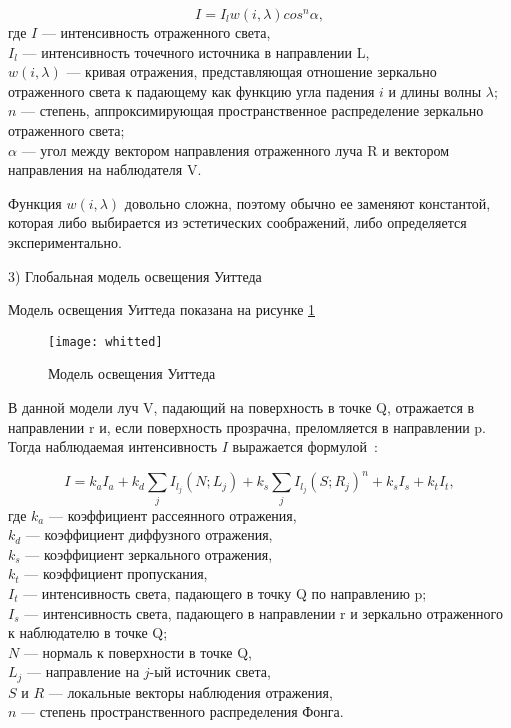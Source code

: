 \begin{equation}\label{phong_ref_eq}
	I = I_l w(i, \lambda) cos^n \alpha,
\end{equation}
где $I$ --- интенсивность отраженного света,\\
\text{~~~~~~}$I_l$ --- интенсивность точечного источника в направлении L,\\
\text{~~~~~~}$w(i, \lambda)$ --- кривая отражения, представляющая отношение зеркально отраженного света к падающему как функцию угла падения $i$ и длины волны $\lambda$;\\
\text{~~~~~~}$n$ --- степень, аппроксимирующая пространственное распределение зеркально отраженного света;\\
\text{~~~~~~}$\alpha$ --- угол между вектором направления отраженного луча R и
вектором направления на наблюдателя V.

Функция $w(i, \lambda)$ довольно
сложна, поэтому обычно ее заменяют константой, которая либо выбирается из
эстетических соображений, либо определяется экспериментально.

3) Глобальная модель освещения Уиттеда

Модель освещения Уиттеда показана на рисунке \ref{whitted}

\begin{figure}[H]
	\centering
	\texttt{[image: whitted]}
	\caption{Модель освещения Уиттеда}
	\label{whitted}
\end{figure}

В данной модели луч V, падающий на поверхность в точке Q, отражается в
направлении r и, если поверхность прозрачна, преломляется в направлении p. Тогда наблюдаемая интенсивность $I$ выражается формулой~\cite{rojers}:

\begin{equation}\label{whitted_eq}
	I = k_a I_a + k_d \sum_{j} I_{l_j} (N; L_j) + k_s \sum_{j} I_{l_j} (S; R_j)^n + k_s I_s + k_t I_t,
\end{equation}
где $k_a$ --- коэффициент рассеянного отражения,\\
\text{~~~~~~}$k_d$ --- коэффициент диффузного отражения,\\
\text{~~~~~~}$k_s$ --- коэффициент зеркального отражения,\\
\text{~~~~~~}$k_t$ --- коэффициент пропускания,\\
\text{~~~~~~}$I_t$ --- интенсивность света, падающего в точку Q по направлению p;\\
\text{~~~~~~}$I_s$ --- интенсивность света, падающего в направлении r и зеркально отраженного к наблюдателю в точке Q;\\
\text{~~~~~~}$N$ --- нормаль к поверхности в точке Q,\\
\text{~~~~~~}$L_j$ --- направление на $j$-ый источник света,\\
\text{~~~~~~}$S$ и $R$ --- локальные векторы наблюдения отражения,\\
\text{~~~~~~}$n$ --- степень пространственного распределения Фонга.

